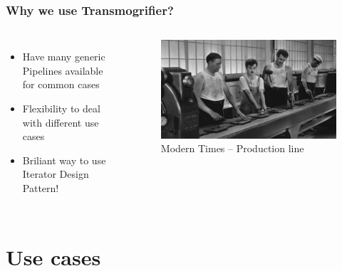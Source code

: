 \documentclass[aspectratio=169]{beamer}
\begin{document}
\begin{frame}
  \frametitle{Why we use Transmogrifier?}

  \begin{columns}
    \begin{itemize}
      \item Have many generic Pipelines available for common cases
      \item Flexibility to deal with different use cases
      \item Briliant way to use Iterator Design Pattern!
    \end{itemize}

    \begin{figure}
      \includegraphics[width=\textwidth]{./src/img/001_-_modern_times.jpg}
      \caption{Modern Times -- Production line}
    \end{figure}
  \end{columns}
\end{frame}

\section{Use cases}
\end{document}
